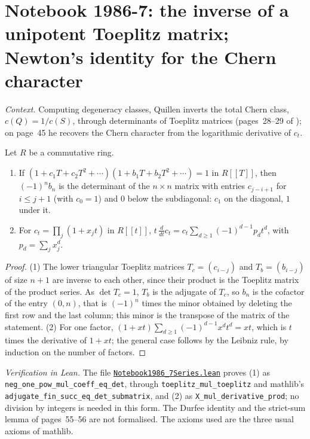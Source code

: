\section[Notebook 1986-7: inverse Toeplitz determinants; Newton]{Notebook 1986-7: the inverse of a unipotent Toeplitz matrix; Newton's identity for the Chern character\protect{}}\label{sec:quillen-1986-7-series}

\emph{Context.} Computing degeneracy classes, Quillen inverts the total Chern class, $c(Q) = 1/c(S)$, through determinants of Toeplitz matrices (pages~28--29 of ); on page~45 he recovers the Chern character from the logarithmic derivative of $c_t$.

\begin{encadre}
\begin{theoreme}\label{thm:quillen-1986-7-series}
Let $R$ be a commutative ring.
\begin{enumerate}
\item If $(1 + c_1T + c_2T^2 + \cdots)(1 + b_1T + b_2T^2 + \cdots) = 1$ in $R[[T]]$, then $(-1)^nb_n$ is the determinant of the $n \times n$ matrix with entries $c_{j-i+1}$ for $i \le j + 1$ (with $c_0 = 1$) and $0$ below the subdiagonal: $c_1$ on the diagonal, $1$ under it.
\item For $c_t = \prod_j(1 + x_jt)$ in $R[[t]]$, $t\,\frac{d}{dt}c_t = c_t\sum_{d\ge1}(-1)^{d-1}p_dt^d$, with $p_d = \sum_j x_j^d$.
\end{enumerate}
\end{theoreme}
\end{encadre}

\begin{proof}
(1) The lower triangular Toeplitz matrices $T_c = (c_{i-j})$ and $T_b = (b_{i-j})$ of size $n + 1$ are inverse to each other, since their product is the Toeplitz matrix of the product series. As $\det T_c = 1$, $T_b$ is the adjugate of $T_c$, so $b_n$ is the cofactor of the entry $(0, n)$, that is $(-1)^n$ times the minor obtained by deleting the first row and the last column; this minor is the transpose of the matrix of the statement. (2) For one factor, $(1 + xt)\sum_{d\ge1}(-1)^{d-1}x^dt^d = xt$, which is $t$ times the derivative of $1 + xt$; the general case follows by the Leibniz rule, by induction on the number of factors.
\end{proof}

\emph{Verification in Lean.} The file \href{\leanblobmain/Notebook1986_7Series.lean}{\texttt{Notebook1986\_7Series.\allowbreak{}lean}} proves (1) as \texttt{neg\_one\_pow\_mul\_coeff\_eq\_det}, through \texttt{toeplitz\_mul\_toeplitz} and mathlib's \texttt{adjugate\_fin\_succ\_eq\_det\_submatrix}, and (2) as \texttt{X\_mul\_derivative\_prod}; no division by integers is needed in this form. The Durfee identity and the strict-sum lemma of pages~55--56 are not formalised. The axioms used are the three usual axioms of mathlib.

